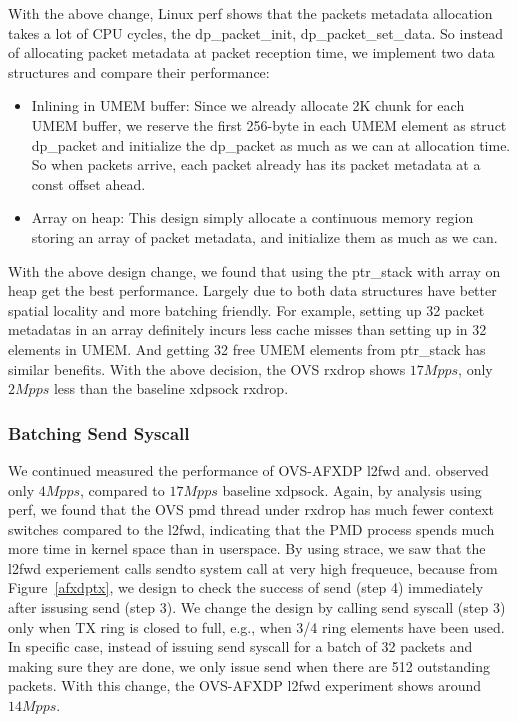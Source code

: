\documentclass[10pt]{sigplanconf}
\begin{document}
With the above change, Linux perf shows that the packets metadata allocation
takes a lot of CPU cycles, the dp\_packet\_init, dp\_packet\_set\_data.
So instead of allocating packet metadata at packet reception time, we
implement two data structures and compare their performance:
\begin{itemize}
\item Inlining in UMEM buffer: Since we already allocate 2K chunk for each
UMEM buffer, we reserve the first 256-byte in each UMEM element as struct dp\_packet
and initialize the dp\_packet as much as we can at allocation time.
So when packets arrive, each packet already has its packet metadata at a const
offset ahead.
\item Array on heap: This design simply allocate a continuous memory region
storing an array of packet metadata, and initialize them as much as we can.
\end{itemize}


With the above design change, we found that using the ptr\_stack with
array on heap get the best performance. Largely due to both data structures
have better spatial locality and more batching friendly.
For example, setting up 32 packet metadatas in an array definitely incurs
less cache misses than setting up in 32 elements in UMEM.
And getting 32 free UMEM elements from ptr\_stack has similar benefits.
With the above decision, the OVS rxdrop shows $17Mpps$, only $2Mpps$ less
than the baseline xdpsock rxdrop.

\subsubsection{Batching Send Syscall}
We continued measured the performance of OVS-AFXDP l2fwd and.
observed only $4Mpps$, compared to $17Mpps$ baseline xdpsock.
Again, by analysis using perf, we found that the OVS pmd thread under rxdrop
has much fewer context switches compared to the l2fwd, indicating that
the PMD process spends much more time in kernel space than in userspace.
By using strace, we saw that the l2fwd experiement calls sendto system call
at very high frequeuce, because from Figure~\ref{afxdptx}, we design to check
the success of send (step 4) immediately after issusing send (step 3).
We change the design by calling send syscall (step 3) only when TX ring is
closed to full, e.g., when 3/4 ring elements have been used.
In specific case, instead of issuing send syscall for a batch of 32 packets
and making sure they are done, we only issue send when there are 512 outstanding
packets.  With this change, the OVS-AFXDP l2fwd experiment shows around $14Mpps$.






\end{document}
